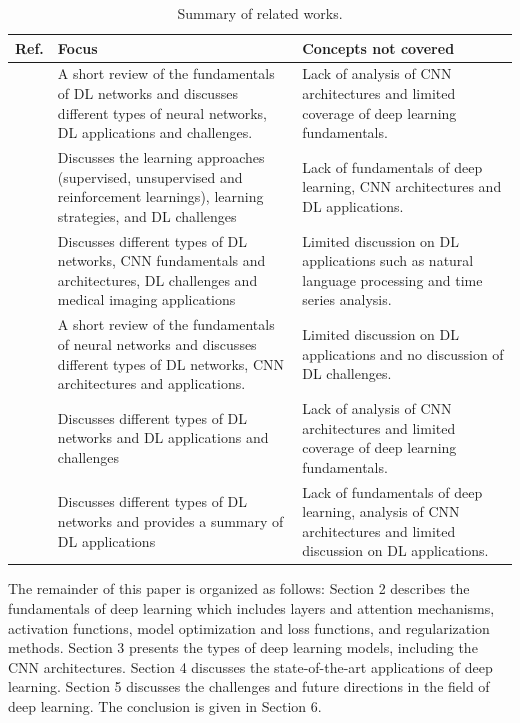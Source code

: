 \documentclass[preprint,12pt]{elsarticle}
\begin{document}
\begin{center}
\begin{table}
\caption{Summary of related works.}
\begin{tabular}{|p{1cm} | p{6.5cm} | p{6.5cm}|}
 \hline
 Ref. & Focus & Concepts not covered \\ 
 \hline
 \citep{dong_survey_2021} & A short review of the fundamentals of DL networks and discusses different types of neural networks, DL applications and challenges. & Lack of analysis of CNN architectures and limited coverage of deep learning fundamentals. \\ 
 \hline
 \citep{talaei_khoei_deep_2023} & Discusses the learning approaches (supervised, unsupervised and reinforcement learnings), learning strategies, and DL challenges & Lack of fundamentals of deep learning, CNN architectures and DL applications. \\
 \hline
\citep{alzubaidi_review_2021} & Discusses different types of DL networks, CNN fundamentals and architectures, DL challenges and medical imaging applications & Limited discussion on DL applications such as natural language processing and time series analysis. \\
 \hline
 \citep{alom_state_art_2019} & A short review of the fundamentals of neural networks and discusses different types of DL networks, CNN architectures and applications. & Limited discussion on DL applications and no discussion of DL challenges. \\
 \hline
 \citep{pouyanfar_survey_2018} & Discusses different types of DL networks and DL applications and challenges & Lack of analysis of CNN architectures and limited coverage of deep learning fundamentals. \\ 
 \hline
 \citep{sarker_deep_2021} & Discusses different types of DL networks and provides a summary of DL applications & Lack of fundamentals of deep learning, analysis of CNN architectures and limited discussion on DL applications. \\ 
 \hline
\end{tabular}
\label{table_summary_related_works}
\end{table}
\end{center}

The remainder of this paper is organized as follows: Section 2 describes the fundamentals of deep learning which includes layers and attention mechanisms, activation functions, model optimization and loss functions, and regularization methods. Section 3 presents the types of deep learning models, including the CNN architectures. Section 4 discusses the state-of-the-art applications of deep learning. Section 5 discusses the challenges and future directions in the field of deep learning. The conclusion is given in Section 6.
\end{document}
